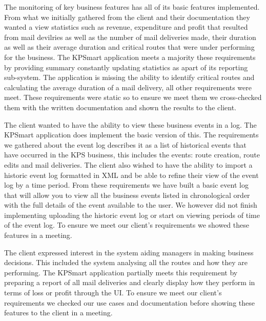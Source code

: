 \documentclass{style/CRPITStyle}
\begin{document}
\vspace{.1in}

The monitoring of key business features has all of its basic features
implemented. From what we initially gathered from the client and their
documentation they wanted a view statistics such as revenue, expenditure and profit
that resulted from mail devilries as well as the number of mail deliveries made,
their duration as well as their average duration and critical routes that were
under performing for the business.
The KPSmart application meets a majority these requirements by providing summary constantly
updating statistics as apart of its reporting sub-system.
The application is missing the ability to identify critical routes and
calculating the average duration of a mail delivery, all other requirements were
meet. These requirements were static  so to ensure we meet them we cross-checked
them with the written documentation and shown the results to the client.

\vspace{.1in}

The client wanted to have the ability to view these business events in a log.
The KPSmart application does implement the basic version of this. The
requirements we gathered about the event log describes it as a list of
historical events that have occurred in the KPS business, this includes the
events: route creation, route edits and mail deliveries. The client also wished
to have the ability to import a historic event log formatted in XML and be able
to refine their view of the event log by a time period. From these requirements
we have built a basic event log that will allow you to view all the business
events listed in chronological order with the full details of the event
available to the user. We however did not finish implementing uploading the
historic event log or start on viewing periods of time of the event log. To
ensure we meet our client's requirements we showed these features in a meeting.

\vspace{.1in}

The client expressed interest in the system aiding managers in making business
decisions. This included the system analysing all the routes and how they are
performing. The KPSmart application partially meets this requirement by
preparing a report of all mail deliveries and clearly display how they perform 
in terms of loss or profit through the UI.  To ensure we meet our client's
requirements we checked our use cases and documentation before showing these
features to the client in a meeting.
\end{document}
